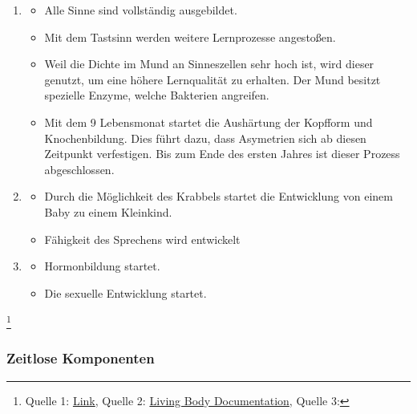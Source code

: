 \begin{itemize}
\begin{enumerate}
	\item[0 Jahre - 8 Monate]
	\begin{itemize}
		\item Alle Sinne sind vollständig ausgebildet.
		\item Mit dem Tastsinn werden weitere Lernprozesse angestoßen.
		\item Weil die Dichte im Mund an Sinneszellen sehr hoch ist, wird dieser genutzt, um eine höhere Lernqualität zu erhalten. Der Mund besitzt spezielle Enzyme, welche Bakterien angreifen.
		\item Mit dem 9 Lebensmonat startet die Aushärtung der Kopfform und Knochenbildung. Dies führt dazu, dass Asymetrien sich ab diesen Zeitpunkt verfestigen. Bis zum Ende des ersten Jahres ist dieser Prozess abgeschlossen.
	\end{itemize}
	\item[1 Jahr]
	\begin{itemize}
		\item Durch die Möglichkeit des Krabbels startet die Entwicklung von einem Baby zu einem Kleinkind.
		\item Fähigkeit des Sprechens wird entwickelt
	\end{itemize}
	\item[11 Jahren]
	\begin{itemize}
		\item Hormonbildung startet.
		\item Die sexuelle Entwicklung startet.
	\end{itemize}
\end{enumerate}
\footnote{
	Quelle 1: \href{https://www.ipzf.de/gehirnentwicklung.html}{Link},
	Quelle 2: \href{https://www.youtube.com/watch?v=ZNYv_ory8rc}{Living Body Documentation},
	Quelle 3: %
}



\subsubsection{Zeitlose Komponenten}


\end{itemize}
